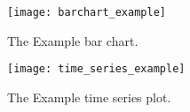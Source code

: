 \begin{figure}[ht]
\centering
\texttt{[image: barchart\_example]}
\caption{The Example bar chart.}
\label{fig:barchart_example}
\end{figure}
\clearpage
\begin{figure}[ht]
\centering
\texttt{[image: time\_series\_example]}
\caption{The Example time series plot.}
\label{fig:piechart_example}
\end{figure}